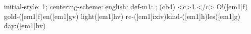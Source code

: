 initial-style: 1;
centering-scheme: english;
def-m1: \grealign;
(cb4) <c>1.</c> O!([em1]f) gold-([em1]f)en([em1]gv) light([em1]hv) re-([em1]ixiv)kind-([em1]h)les([em1]g) day:([em1]hv)